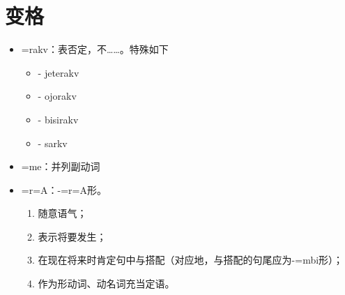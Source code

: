 \section{变格}

\begin{itemize}
    \item \V=rakv：表否定，不……。特殊如下
        \begin{itemize}
            \item {} - jeterakv
            \item {} - ojorakv
            \item {} - bisirakv
            \item {} - sarkv
        \end{itemize}
    \item \V=me：并列副动词
    \item \V=r=A：-=r=A形。
        \begin{enumerate}
            \item 随意语气；
            \item 表示将要发生；
            \item 在现在将来时肯定句中与搭配（对应地，与搭配的句尾应为-=mbi形）；
            \item 作为形动词、动名词充当定语。
        \end{enumerate}
\end{itemize}
